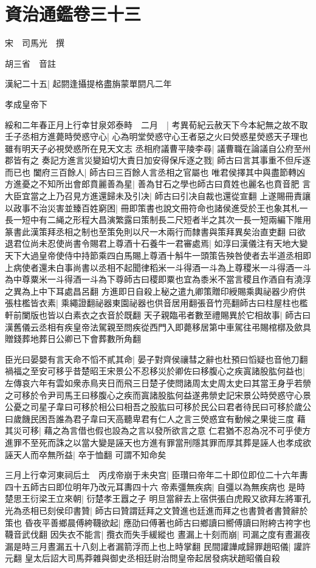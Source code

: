 \chapter{資治通鑑卷三十三}
宋　司馬光　撰

胡三省　音註

漢紀二十五|{
	起閼逢攝提格盡旃蒙單閼凡二年}


孝成皇帝下

綏和二年春正月上行幸甘泉郊泰畤　二月　|{
	考異荀紀云赦天下今本紀無之故不取}
壬子丞相方進薨時熒惑守心|{
	心為明堂熒惑守心王者惡之火曰熒惑星熒惑天子理也雖有明天子必視熒惑所在見天文志}
丞相府議曹平陵李尋|{
	議曹職在論議自公府至州郡皆有之}
奏記方進言災變廹切大責日加安得保斥逐之戮|{
	師古曰言其事重不但斥逐而已也}
闔府三百餘人|{
	師古曰三百餘人言丞相之官屬也}
唯君侯擇其中與盡節轉凶方進憂之不知所出會郎賁麗善為星|{
	善為甘石之學也師古曰賁姓也麗名也賁音肥}
言大臣宜當之上乃召見方進還歸未及引决|{
	師古曰引决自裁也還從宣翻}
上遂賜冊責讓以政事不治災害並臻百姓窮困|{
	冊即策書也說文冊符命也諸侯進受於王也象其札一長一短中有二䋲之形程大昌演繁露曰策制長二尺短者半之其次一長一短兩編下陮用篆書此漢策拜丞相之制也至策免則以尺一木兩行而隸書與策拜異矣治直吏翻}
曰欲退君位尚未忍使尚書令賜君上尊酒十石養牛一君審處焉|{
	如淳曰漢儀注有天地大變天下大過皇帝使侍中持節乘四白馬賜上尊酒十斛牛一頭策告殃咎使者去半道丞相即上病使者還未白事尚書以丞相不起聞律稻米一斗得酒一斗為上尊稷米一斗得酒一斗為中尊粟米一斗得酒一斗為下尊師古曰稷即粟也宜為黍米不當言稷且作酒自有澆淳之異為上中下耳處昌呂翻}
方進即日自殺上秘之遣九卿策贈印綬賜乘輿祕器少府供張柱檻皆衣素|{
	乘繩證翻祕器東園祕器也供音居用翻張音竹亮翻師古曰柱屋柱也檻軒前闌版也皆以白素衣之衣音於既翻}
天子親臨弔者數至禮賜異於它相故事|{
	師古曰漢舊儀云丞相有疾皇帝法駕親至問疾從西門入即薨移居第中車駕往弔賜棺槨及歛具贈錢葬地葬日公卿已下會葬數所角翻}


臣光曰晏嬰有言天命不慆不貳其命|{
	晏子對齊侯禳彗之辭也杜預曰慆疑也音他刀翻}
禍福之至安可移乎昔楚昭王宋景公不忍移災於卿佐曰移腹心之疾寘諸股肱何益也|{
	左傳哀六年有雲如衆赤鳥夹日而飛三日楚子使問諸周太史周太史曰其當王身乎若禜之可移於令尹司馬王曰移腹心之疾而寘諸股肱何益遂弗禜史記宋景公時熒惑守心景公憂之司星子韋曰可移於相公曰相吾之股肱曰可移於民公曰君者待民曰可移於歲公曰歲饑民困吾誰為君子韋曰天高聽卑君有仁人之言三熒惑宜有動候之果徙三度}
藉其災可移|{
	藉之為言借也假也設為之言以發所欲言之意}
仁君猶不忍為况不可乎使方進罪不至死而誅之以當大變是誣天也方進有罪當刑隱其罪而厚其葬是誣人也孝成欲誣天人而卒無所益|{
	卒于恤翻}
可謂不知命矣

三月上行幸河東祠后土　丙戌帝崩于未央宫|{
	臣瓚曰帝年二十即位即位二十六年夀四十五師古曰即位明年乃改元耳夀四十六}
帝素彊無疾病|{
	自彊以為無疾病也}
是時楚思王衍梁王立來朝|{
	衍楚孝王囂之子}
明旦當辭去上宿供張白虎殿又欲拜左將軍孔光為丞相已刻侯印書贊|{
	師古曰贊謂廷拜之文贊進也廷進而拜之也書贊者書贊辭於策也}
昏夜平善鄉晨傅絝韈欲起|{
	應劭曰傅著也師古曰鄉讀曰嚮傅讀曰附絝古袴字也韈音武伐翻}
因失衣不能言|{
	攬衣而失手緩縱也}
晝漏上十刻而崩|{
	司漏之度有晝漏夜漏是時三月晝漏五十八刻上者漏箭浮而上也上時掌翻}
民間讙譁咸歸罪趙昭儀|{
	讙許元翻}
皇太后詔大司馬莽雜與御史丞相廷尉治問皇帝起居發病狀趙昭儀自殺

